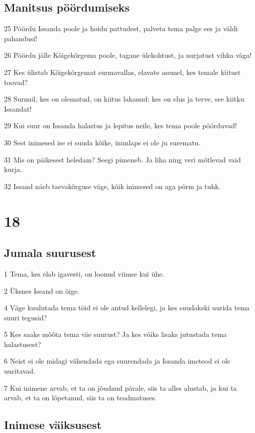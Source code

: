 \section*{Manitsus pöördumiseks}

\par 25 Pöördu Issanda poole ja hoidu pattudest, palveta tema palge ees ja väldi pahandusi!
\par 26 Pöördu jälle Kõigekõrgema poole, tagane ülekohtust, ja nurjatust vihka väga!
\par 27 Kes ülistab Kõigekõrgemat surmavallas, elavate asemel, kes temale kiitust toovad?
\par 28 Surnuil, kes on olematud, on kiitus lakanud: kes on elus ja terve, see kiitku Issandat!
\par 29 Kui suur on Issanda halastus ja lepitus neile, kes tema poole pöörduvad!
\par 30 Sest inimesed ise ei suuda kõike, inimlaps ei ole ju surematu.
\par 31 Mis on päikesest heledam? Seegi pimeneb. Ja liha ning veri mõtlevad vaid kurja.
\par 32 Issand näeb taevakõrguse väge, kõik inimesed on aga põrm ja tuhk.

\chapter{18}

\section*{Jumala suurusest}

\par 1 Tema, kes elab igavesti, on loonud viimse kui ühe.
\par 2 Üksnes Issand on õige.
\par 4 Väge kuulutada tema töid ei ole antud kellelegi, ja kes suudakski uurida tema suuri tegusid?
\par 5 Kes saaks mõõta tema väe suurust? Ja kes võiks lisaks jutustada tema halastusest?
\par 6 Neist ei ole midagi vähendada ega suurendada ja Issanda imeteod ei ole uuritavad.
\par 7 Kui inimene arvab, et ta on jõudnud pärale, siis ta alles alustab, ja kui ta arvab, et ta on lõpetanud, siis ta on teadmatuses.

\section*{Inimese väiksusest}

